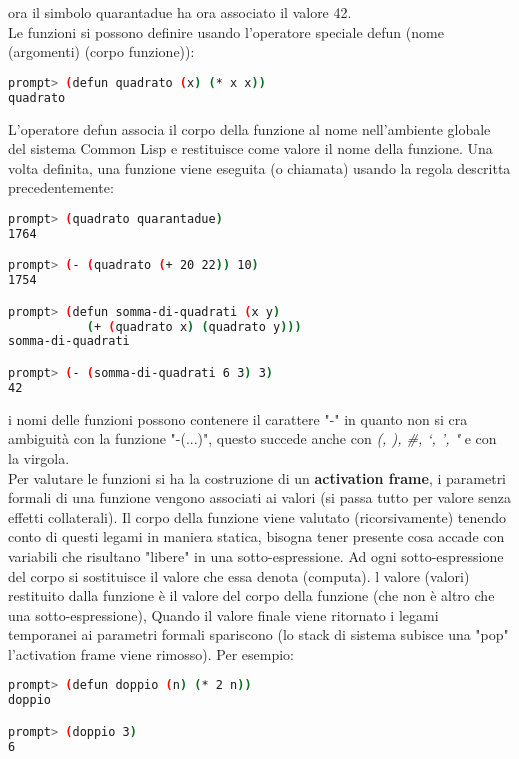 \documentclass[a4paper,12pt, oneside]{book}
\begin{document}
ora il simbolo quarantadue ha ora associato il valore 42.\\
Le funzioni si possono definire usando l'operatore speciale defun (nome (argomenti) (corpo funzione)):
\begin{shaded}
\begin{lstlisting}[language=bash]
prompt> (defun quadrato (x) (* x x))
quadrato
\end{lstlisting}
\end{shaded}
L'operatore defun associa il corpo della funzione al nome
nell'ambiente globale del sistema Common Lisp e restituisce come valore il nome della funzione. Una volta definita, una funzione viene eseguita (o chiamata) usando la regola descritta precedentemente:
\begin{shaded}
\begin{lstlisting}[language=bash]
prompt> (quadrato quarantadue)
1764

prompt> (- (quadrato (+ 20 22)) 10)
1754

prompt> (defun somma-di-quadrati (x y)
           (+ (quadrato x) (quadrato y)))
somma-di-quadrati

prompt> (- (somma-di-quadrati 6 3) 3)
42
\end{lstlisting}
\end{shaded}
i nomi delle funzioni possono contenere il carattere "-" in quanto non si cra ambiguità con la funzione "-(...)", questo succede anche con \textit{(, ), \#, ‘, ', "} e con la virgola.\\
Per valutare le funzioni si ha la costruzione di un \textbf{activation frame}, i parametri formali di una funzione vengono associati ai valori (si passa tutto per valore senza effetti collaterali). Il corpo della funzione viene valutato (ricorsivamente) tenendo conto di questi legami in maniera statica, bisogna tener presente cosa accade con variabili che risultano
"libere" in una sotto-espressione. Ad ogni sotto-espressione del corpo si sostituisce il valore che essa denota (computa). l valore (valori) restituito dalla funzione è il valore del corpo della funzione (che non è altro che una sotto-espressione), Quando il valore finale viene ritornato i legami temporanei ai parametri formali spariscono (lo stack di sistema subisce una "pop" l'activation frame viene rimosso). Per esempio:
\begin{shaded}
\begin{lstlisting}[language=bash]
prompt> (defun doppio (n) (* 2 n))
doppio

prompt> (doppio 3)
6
\end{lstlisting}
\end{shaded}
\end{document}

